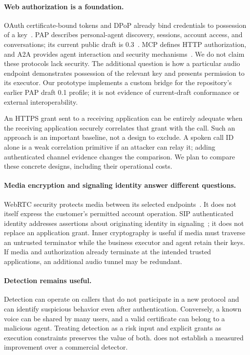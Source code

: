 \paragraph{Web authorization is a foundation.}
OAuth certificate-bound tokens and DPoP already bind credentials to possession
of a key~\cite{rfc8705,rfc9449}. PAP describes personal-agent discovery, sessions,
account access, and conversations; its current public draft is 0.3~\cite{pap03}.
MCP defines HTTP authorization, and A2A provides agent interaction and security
mechanisms~\cite{mcp,a2a}. We do not claim these protocols lack security. The
additional question is how a particular audio endpoint demonstrates possession
of the relevant key and presents permission to its executor. Our prototype
implements a custom bridge for the repository's earlier PAP draft 0.1 profile;
it is not evidence of current-draft conformance or external interoperability.

An HTTPS grant sent to a receiving application can be entirely adequate when
the receiving application securely correlates that grant with the call. Such
an approach is an important baseline, not a design to exclude. A spoken call ID
alone is a weak correlation primitive if an attacker can relay it; adding
authenticated channel evidence changes the comparison. We plan to compare
these concrete designs, including their operational costs.

\paragraph{Media encryption and signaling identity answer different questions.}
WebRTC security protects media between its selected endpoints~\cite{rfc8826}.
It does not itself express the customer's permitted account operation. SIP
authenticated identity addresses assertions about originating identity in
signaling~\cite{rfc8224}; it does not replace an application grant. Inner
cryptography is useful if media must traverse an untrusted terminator while
the business executor and agent retain their keys. If media and authorization
already terminate at the intended trusted applications, an additional audio
tunnel may be redundant.

\paragraph{Detection remains useful.}
Detection can operate on callers that do not participate in a new protocol and
can identify suspicious behavior even after authentication. Conversely, a
known voice can be shared by many users, and a valid certificate can belong to
a malicious agent. Treating detection as a risk input and explicit grants as
execution constraints preserves the value of both. \sys{} does not establish
a measured improvement over a commercial detector.

